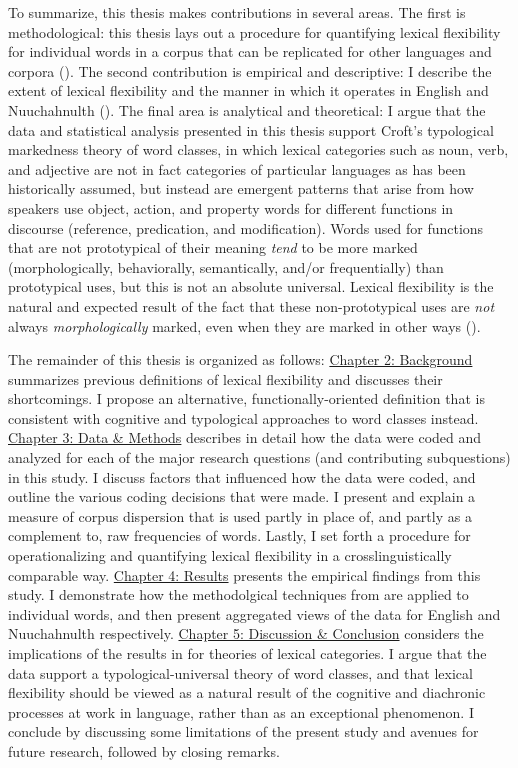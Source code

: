 To summarize, this thesis makes contributions in several areas. The first is methodological: this thesis lays out a procedure for quantifying lexical flexibility for individual words in a corpus that can be replicated for other languages and corpora (). The second contribution is empirical and descriptive: I describe the extent of lexical flexibility and the manner in which it operates in English and Nuuchahnulth (). The final area is analytical and theoretical: I argue that the data and statistical analysis presented in this thesis support Croft's typological markedness theory of word classes, in which lexical categories such as noun, verb, and adjective are not in fact categories of particular languages as has been historically assumed, but instead are emergent patterns that arise from how speakers use object, action, and property words for different functions in discourse (reference, predication, and modification). Words used for functions that are not prototypical of their meaning \emph{tend} to be more marked (morphologically, behaviorally, semantically, and/or frequentially) than prototypical uses, but this is not an absolute universal. Lexical flexibility is the natural and expected result of the fact that these non-prototypical uses are \emph{not} always \emph{morphologically} marked, even when they are marked in other ways ().

The remainder of this thesis is organized as follows: \hyperref[ch:background]{Chapter 2: Background} summarizes previous definitions of lexical flexibility and discusses their shortcomings. I propose an alternative, functionally-oriented definition that is consistent with cognitive and typological approaches to word classes instead. \hyperref[ch:background]{Chapter 3: Data \& Methods} describes in detail how the data were coded and analyzed for each of the major research questions (and contributing subquestions) in this study. I discuss factors that influenced how the data were coded, and outline the various coding decisions that were made. I present and explain a measure of corpus dispersion that is used partly in place of, and partly as a complement to, raw frequencies of words. Lastly, I set forth a procedure for operationalizing and quantifying lexical flexibility in a crosslinguistically comparable way. \hyperref[ch:background]{Chapter 4: Results} presents the empirical findings from this study. I demonstrate how the methodolgical techniques from  are applied to individual words, and then present aggregated views of the data for English and Nuuchahnulth respectively. \hyperref[ch:background]{Chapter 5: Discussion \& Conclusion} considers the implications of the results in  for theories of lexical categories. I argue that the data support a typological-universal theory of word classes, and that lexical flexibility should be viewed as a natural result of the cognitive and diachronic processes at work in language, rather than as an exceptional phenomenon. I conclude by discussing some limitations of the present study and avenues for future research, followed by closing remarks.
